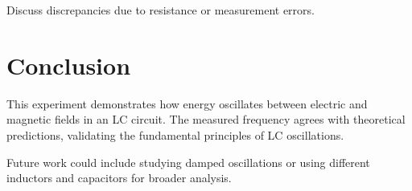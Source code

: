 \documentclass[a4paper,12pt]{article}
\begin{document}
Discuss discrepancies due to resistance or measurement errors.

\section{Conclusion}

This experiment demonstrates how energy oscillates between electric and magnetic fields in an LC circuit. The measured frequency agrees with theoretical predictions, validating the fundamental principles of LC oscillations.

Future work could include studying damped oscillations or using different inductors and capacitors for broader analysis.



\end{document}
